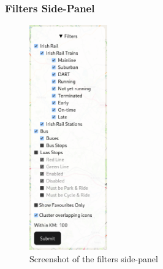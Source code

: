 \documentclass[a4paper,11pt]{report}
\begin{document}
\subsubsection{Filters Side-Panel}
\begin{figure}[H]
    \centering
    \includegraphics[width=0.3\textwidth]{./images/filterspanel.png}
    \caption{Screenshot of the filters side-panel}
\end{figure}
\end{document}
